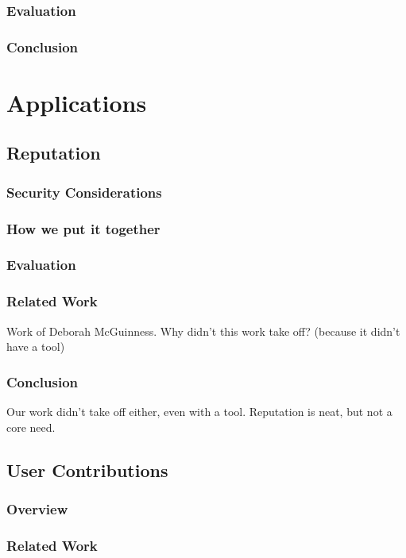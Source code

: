     \section{Evaluation}
    \section{Conclusion}

\part{Applications}

\chapter{Reputation}
    \section{Security Considerations}
    \section{How we put it together}
    \section{Evaluation}
    \section{Related Work}
        Work of Deborah McGuinness.  Why didn't this work take off?
        (because it didn't have a tool)
    \section{Conclusion}
        Our work didn't take off either, even with a tool.
        Reputation is neat, but not a core need.

\chapter{User Contributions}

    \section{Overview}
    \section{Related Work}
